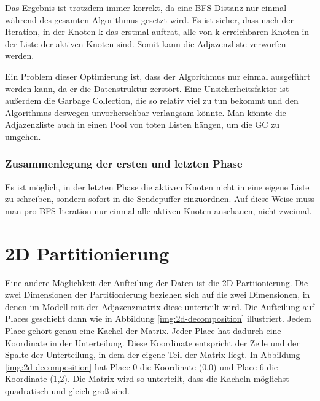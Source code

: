 Das Ergebnis ist trotzdem immer korrekt, da eine BFS-Distanz nur einmal während des gesamten Algorithmus gesetzt wird. Es ist sicher, dass nach der Iteration, in der Knoten k das erstmal auftrat, alle von k erreichbaren Knoten in der Liste der aktiven Knoten sind. Somit kann die Adjazenzliste verworfen werden.

Ein Problem dieser Optimierung ist, dass der Algorithmus nur einmal ausgeführt werden kann, da er die Datenstruktur zerstört. Eine Unsicherheitsfaktor ist außerdem die Garbage Collection, die so relativ viel zu tun bekommt und den Algorithmus deswegen unvorhersehbar verlangsam könnte. Man könnte die Adjazenzliste auch in einen Pool von toten Listen hängen, um die GC zu umgehen.
\subsubsection{Zusammenlegung der ersten und letzten Phase} %
\label{ssub:zusammenlegung_der_ersten_und_letzten_phase}
Es ist möglich, in der letzten Phase die aktiven Knoten nicht in eine eigene Liste zu schreiben, sondern sofort in die Sendepuffer einzuordnen. Auf diese Weise muss man pro BFS-Iteration nur einmal alle aktiven Knoten anschauen, nicht zweimal.


\section{2D Partitionierung} %
\label{sec:2d_partitionierung}

Eine andere Möglichkeit der Aufteilung der Daten ist die 2D-Partiionierung. Die zwei Dimensionen der Partitionierung beziehen sich auf die zwei Dimensionen, in denen im Modell mit der Adjazenzmatrix diese unterteilt wird. Die Aufteilung auf Places geschieht dann wie in Abbildung \ref{img:2d-decomposition} illustriert. Jedem Place gehört genau eine Kachel der Matrix. Jeder Place hat dadurch eine Koordinate in der Unterteilung. Diese Koordinate entspricht der Zeile und der Spalte der Unterteilung, in dem der eigene Teil der Matrix liegt. In Abbildung \ref{img:2d-decomposition} hat Place 0 die Koordinate (0,0) und Place 6 die Koordinate (1,2). Die Matrix wird so unterteilt, dass die Kacheln möglichst quadratisch und gleich groß sind.

